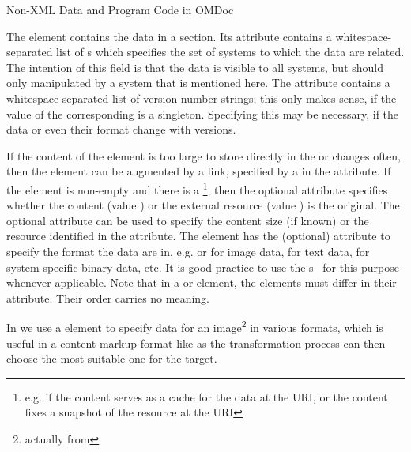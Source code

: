 \begin{module}[id=ext]
\begin{omgroup}[id=ext,short=Auxiliary Elements]
\begin{omgroup}[id=private]{Non-XML Data and Program Code in OMDoc}
\begin{definition}[id=data.def]
  The {} element contains the data in a {} section.  Its
  {} attribute contains a whitespace-separated list of
  {s} which specifies the set of systems to which the data are
  related.  The intention of this field is that the data is visible to all systems, but
  should only manipulated by a system that is mentioned here. The
  {} attribute contains a whitespace-separated list of
  version number strings; this only makes sense, if the value of the corresponding
  {} is a singleton. Specifying this may be necessary, if the data or
  even their format change with versions.

  If the content of the {} element is too large to store directly in the
  {\omdoc} or changes often, then the {} element can be augmented by a link,
  specified by a {} in the {} attribute. If
  the {} element is non-empty and there is a
  {}\footnote{e.g. if the {} content serves as a cache
    for the data at the URI, or the {} content fixes a snapshot of the
    resource at the URI}, then the optional attribute {}
  specifies whether the {} content (value {})
  or the external resource (value {}) is the
  original. The optional {} attribute can be used to specify the
  content size (if known) or the resource identified in the {}
  attribute. The {} element has the (optional) attribute
  {} to specify the format the data are in, e.g.
  {} or {} for image
  data, {} for text data, {}
  for system-specific binary data, etc. It is good practice to use the
  {s}~\cite{FreBor:MIME96} for this purpose whenever applicable.  Note
  that in a {} or {} element, the {} elements
  must differ in their {} attribute. Their order carries no
  meaning.
\end{definition}

In {} we use a {} element to specify data for an
image\footnote{actually {} from {}} in various
formats, which is useful in a content markup format like {\omdoc} as the transformation
process can then choose the most suitable one for the target.


\end{omgroup}
\end{omgroup}
\end{module}
